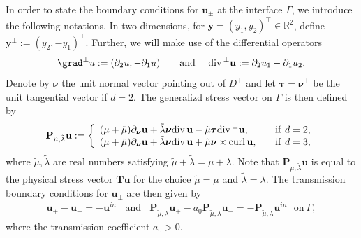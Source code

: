 \documentclass[final,reqno]{siamltex}
\newcommand{\pa}{\partial}
\newcommand{\curl}{{\rm curl\,}}
\newcommand{\dive}{{\rm div\,}}
\newcommand{\mat}{\mathbb}
\newcommand{\R}{{\mat R}}
\begin{document}
In order to state the boundary conditions for $\mathbf{u}_\pm$ at the interface $\Gamma$, we introduce the following notations. In two dimensions, for $\mathbf{y}=(y_1,y_2)^\top\in\R^2$, define $\mathbf{y}^\perp:=(y_2,-y_1)^\top$. Further, we will make use of the differential operators 
$$
  \grad^\perp u:=(\pa_2u,-\pa_1u)^\top~~~~\text{and}~~~~\dive^\perp\mathbf{u}:=\pa_2u_1-\pa_1u_2. 
$$
Denote by $\boldsymbol{\nu}$ the unit normal vector pointing out of $D^+$ and let $\boldsymbol{\tau}=\boldsymbol{\nu}^\perp$ be the unit tangential vector if $d=2$. The generalizd stress vector on $\Gamma$ is then defined by 
\begin{align*}
  \mathbf{P}_{\tilde\mu,\tilde\lambda}\mathbf{u}:=
  \left\{
  \begin{array}{ll}
  	(\mu+\tilde{\mu})\pa_{\boldsymbol{\nu}}\mathbf{u}+\tilde{\lambda}\boldsymbol{\nu}\dive\mathbf{u}-\tilde{\mu}\boldsymbol{\tau}\dive^\perp\mathbf{u},~~~&{\rm if}~d=2,\\
  	(\mu+\tilde{\mu})\pa_{\boldsymbol{\nu}}\mathbf{u}+\tilde{\lambda}\boldsymbol{\nu}\dive\mathbf{u}+\tilde{\mu}\boldsymbol{\nu}\times\curl\mathbf{u},~~~&{\rm if}~d=3, 
  \end{array}
  \right.
\end{align*}
where $\tilde{\mu},\tilde{\lambda}$ are real numbers satisfying $\tilde{\mu}+\tilde{\lambda}=\mu+\lambda$. Note that $\mathbf{P}_{\tilde\mu,\tilde\lambda}\mathbf{u}$ is equal to the physical stress vector $\mathbf{T}\mathbf{u}$ for the choice $\tilde{\mu}=\mu$ and $\tilde{\lambda}=\lambda$. The transmission boundary conditions for $\mathbf{u}_\pm$ are then given by 
\begin{align}\label{1.2}
  \mathbf{u}_+-\mathbf{u}_-=-\mathbf{u}^{in}~~~~\text{and}~~~~\mathbf{P}_{\tilde\mu,\tilde\lambda}\mathbf{u}_+-a_0\mathbf{P}_{\tilde\mu,\tilde\lambda}\mathbf{u}_-=-\mathbf{P}_{\tilde\mu,\tilde\lambda}\mathbf{u}^{in}~~~\text{on}~\Gamma, 
\end{align}
where the transmission coefficient $a_0>0$. 
\end{document}
